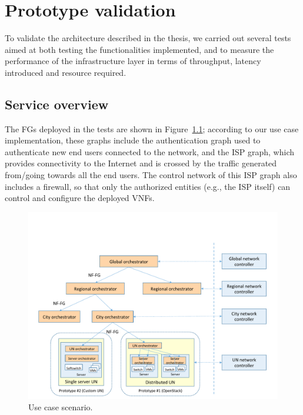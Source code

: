 \chapter{Prototype validation}
\label{sec:validation}

To validate the architecture described in the thesis, we carried out several tests aimed at both testing the functionalities implemented, and to measure the performance of the infrastructure layer in terms of throughput, latency introduced and resource required.

\section{Service overview}

The FGs deployed in the tests are shown in Figure~\ref{fig:deployed_graphs}; according to our use case implementation, these graphs include the authentication graph used to authenticate new end users connected to the network, and the ISP graph, which provides connectivity to the Internet and is crossed by the traffic generated from/going towards all the end users.
The control network of this ISP graph  also includes a firewall, so that only the authorized entities (e.g., the ISP itself) can control and configure the deployed VNFs.

\begin{figure}%
	\centering
	\includegraphics[clip= true, width= 0.8\columnwidth, trim= 0in 0.2in 0.0in 0.6in, page= 29]{images/Pictures_definitivo.pdf}
	\caption{Use case scenario.}
	\label{fig:deployed_graphs}
\end{figure}


